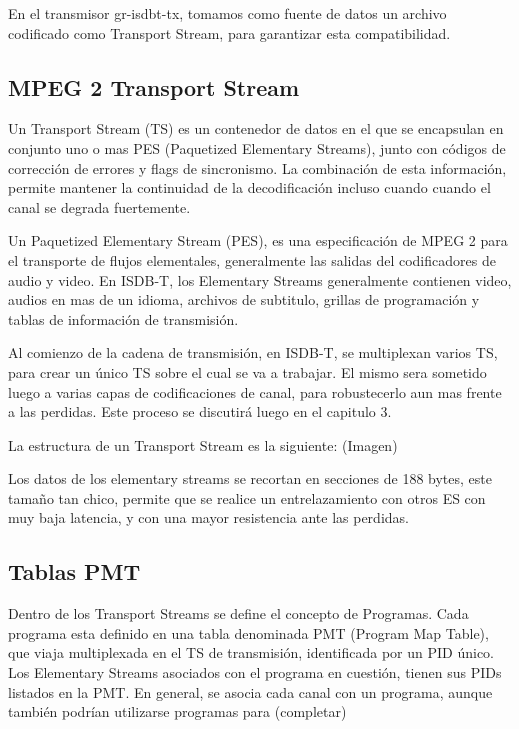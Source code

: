 En el transmisor gr-isdbt-tx, tomamos como fuente de datos un archivo codificado como Transport Stream, para garantizar esta compatibilidad.

	\subsection{MPEG 2 Transport Stream}
	
	Un Transport Stream (TS) es un contenedor de datos en el que se encapsulan en conjunto uno o mas PES (Paquetized Elementary Streams), junto con códigos de corrección de errores y flags de sincronismo. La combinación de esta información, permite mantener la continuidad de la decodificación incluso cuando cuando el canal se degrada fuertemente.
	
	Un Paquetized Elementary Stream (PES), es una especificación de MPEG 2 para el transporte de flujos elementales, generalmente las salidas del codificadores de audio y video. En ISDB-T, los Elementary Streams generalmente contienen video, audios en mas de un idioma, archivos de subtitulo, grillas de programación y tablas de información de transmisión.
	
	Al comienzo de la cadena de transmisión, en ISDB-T, se multiplexan varios TS, para crear un único TS sobre el cual se va a trabajar. El mismo sera sometido luego a varias capas de codificaciones de canal, para robustecerlo aun mas frente a las perdidas. Este proceso se discutirá luego en el capitulo 3.
	
	La estructura de un Transport Stream es la siguiente:
	(Imagen)
	
	Los datos de los elementary streams se recortan en secciones de 188 bytes, este tamaño tan chico, permite que se realice un entrelazamiento con otros ES con muy baja latencia, y con una mayor resistencia ante las perdidas.

	\subsection{Tablas PMT}

	Dentro de los Transport Streams se define el concepto de Programas. Cada programa esta definido en una tabla denominada PMT (Program Map Table), que viaja multiplexada en el TS de transmisión, identificada por un PID único. Los Elementary Streams asociados con el programa en cuestión, tienen sus PIDs listados en la PMT. En general, se asocia cada canal con un programa, aunque también podrían utilizarse programas para (completar)
	
